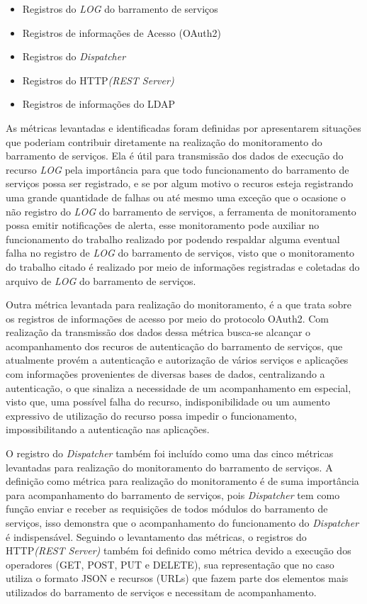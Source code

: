 \begin{itemize}
    \item Registros do \textit{LOG} do barramento de serviços
    \item Registros de informações de Acesso (OAuth2)
    \item Registros do \textit{Dispatcher}
    \item Registros do HTTP\textit{(REST Server)}
    \item Registros de informações do LDAP
\end{itemize}

As métricas levantadas e identificadas foram definidas por apresentarem situações que poderiam contribuir diretamente na realização do monitoramento do barramento de serviços. Ela é útil para transmissão dos dados de execução do recurso \textit{LOG} pela importância para que todo funcionamento do barramento de serviços possa ser registrado, e se por algum motivo o recuros esteja registrando uma grande quantidade de falhas ou até mesmo uma exceção que o ocasione o não registro do \textit{LOG} do barramento de serviços, a ferramenta de monitoramento possa emitir notificações de alerta, esse monitoramento pode auxiliar no funcionamento do trabalho realizado por \cite{filgueirasmonitoramento} podendo respaldar alguma eventual falha no registro de \textit{LOG} do barramento de serviços, visto que o monitoramento do trabalho citado é realizado por meio de informações registradas e coletadas do arquivo de \textit{LOG} do barramento de serviços. 

Outra métrica levantada para realização do monitoramento, é a que trata sobre os registros de informações de acesso por meio do protocolo OAuth2. Com realização da transmissão dos dados dessa métrica busca-se alcançar o acompanhamento dos recuros de autenticação do barramento de serviços, que atualmente provém a autenticação e autorização de vários serviços e aplicações com informações provenientes de diversas bases de dados, centralizando a autenticação, o que sinaliza a necessidade de um acompanhamento em especial, visto que, uma possível falha do recurso, indisponibilidade ou um aumento expressivo de utilização do recurso possa impedir o funcionamento, impossibilitando a autenticação nas aplicações. 

O registro do \textit{Dispatcher} também foi incluído como uma das cinco métricas levantadas para realização do monitoramento do barramento de serviços. A definição como métrica para realização do monitoramento é de suma importância para acompanhamento do barramento de serviços, pois \textit{Dispatcher} tem como função enviar e receber as requisições de todos módulos do barramento de serviços, isso demonstra que o acompanhamento do funcionamento do \textit{Dispatcher} é indispensável. Seguindo o levantamento das métricas, o registros do HTTP\textit{(REST Server)} também foi definido como métrica devido a execução dos operadores (GET, POST, PUT e DELETE), sua representação que no caso utiliza o formato \acrshort{JSON} e recursos (URLs) que fazem parte dos elementos mais utilizados do barramento de serviços e necessitam de acompanhamento.


